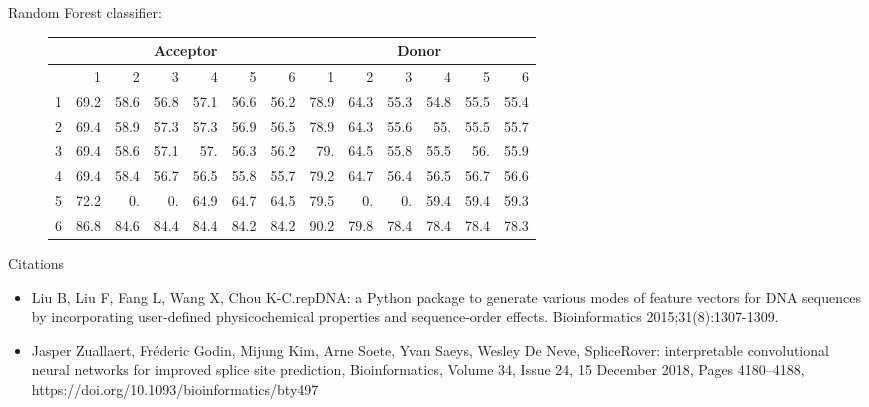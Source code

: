 \documentclass[10pt]{beamer}
\begin{document}
\begin{frame}
	Random Forest classifier:
	\begin{figure}
		\scriptsize
		\begingroup
		\centering
		\def\arraystretch{1.1}
		\begin{tabular}{|r|r|r|r|r|r|r|r|r|r|r|r|r|}
			\hline
			&\multicolumn{6}{c|}{Acceptor}&\multicolumn{6}{c|}{Donor}\\
			\hline
			&1&2&3&4&5&6&1&2&3&4&5&6\\
			\hline
			1&69.2&58.6&56.8&57.1&56.6&56.2&78.9&64.3&55.3&54.8&55.5&55.4\\
			2&69.4&58.9&57.3&57.3&56.9&56.5&78.9&64.3&55.6&55. &55.5&55.7\\
			3&69.4&58.6&57.1&57. &56.3&56.2&79. &64.5&55.8&55.5&56. &55.9\\
			4&69.4&58.4&56.7&56.5&55.8&55.7&79.2&64.7&56.4&56.5&56.7&56.6\\
			5&72.2& 0. & 0. &64.9&64.7&64.5&79.5& 0. & 0. &59.4&59.4&59.3\\
			6&86.8&84.6&84.4&84.4&84.2&84.2&90.2&79.8&78.4&78.4&78.4&78.3\\
			
			\hline 
		\end{tabular}
		\endgroup	
	\end{figure}
\end{frame}

\begin{frame}{Citations}
	\footnotesize
	\begin{itemize}
		\item Liu B, Liu F, Fang L, Wang X, Chou K-C.repDNA: a Python package to generate various modes of feature vectors for DNA sequences by incorporating user-defined physicochemical properties and sequence-order effects. Bioinformatics 2015;31(8):1307-1309.
		\item Jasper Zuallaert, Fréderic Godin, Mijung Kim, Arne Soete, Yvan Saeys, Wesley De Neve, SpliceRover: interpretable convolutional neural networks for improved splice site prediction, Bioinformatics, Volume 34, Issue 24, 15 December 2018, Pages 4180–4188, https://doi.org/10.1093/bioinformatics/bty497
	\end{itemize}
\end{frame}
\end{document}
